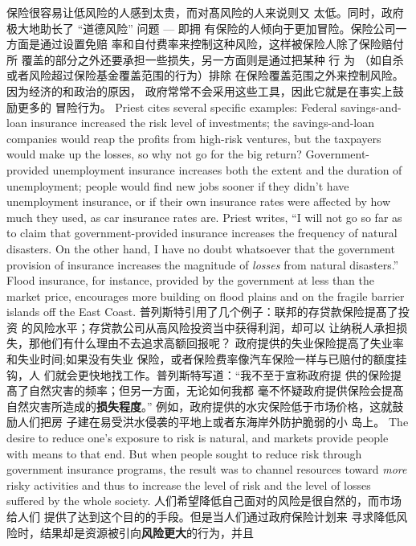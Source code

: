 \begin{paracol}{2}
保险很容易让低风险的人感到太贵，而对髙风险的人来说则又
太低。同时，政府极大地助长了 “道德风险” 问题 --- 即拥
有保险的人倾向于更加冒险。保险公司一方面是通过设置免赔
率和自付费率来控制这种风险，这样被保险人除了保险赔付所
覆盖的部分之外还要承担一些损失，另一方面则是通过把某种
行 为 （如自杀或者风险超过保险基金覆盖范围的行为）排除
在保险覆盖范围之外来控制风险。因为经济的和政治的原因，
政府常常不会采用这些工具，因此它就是在事实上鼓励更多的
冒险行为。
\switchcolumn*
Priest cites several specific examples: Federal savings-and-loan insurance increased the risk level of investments; the savings-and-loan companies would reap the profits from high-risk
ventures, but the taxpayers would make up the losses, so why
not go for the big return? Government-provided unemployment insurance increases both the extent and the duration of
unemployment; people would find new jobs sooner if they
didn't have unemployment insurance, or if their own insurance
rates were affected by how much they used, as car insurance
rates are. Priest writes, ``I will not go so far as to claim that government-provided insurance increases the frequency of natural
disasters. On the other hand, I have no doubt whatsoever that
the government provision of insurance increases the magnitude of \textit{losses} from natural disasters.'' Flood insurance, for instance,
provided by the government at less than the market price, encourages more building on flood plains and on the fragile barrier islands off the East Coast.
\switchcolumn
普列斯特引用了几个例子：联邦的存贷款保险提髙了投资
的风险水平；存贷款公司从高风险投资当中获得利润，却可以
让纳税人承担损失，那他们有什么理由不去追求高额回报呢？
政府提供的失业保险提高了失业率和失业时间;如果没有失业
保险，或者保险费率像汽车保险一样与已赔付的额度挂钩，人
们就会更快地找工作。普列斯特写道：“我不至于宣称政府提
供的保险提髙了自然灾害的频率；但另一方面，无论如何我都
毫不怀疑政府提供保险会提髙自然灾害所造成的\textbf{损失程度}。”
例如，政府提供的水灾保险低于市场价格，这就鼓励人们把房
子建在易受洪水侵袭的平地上或者东海岸外防护脆弱的小
岛上。
\switchcolumn*
The desire to reduce one's exposure to risk is natural, and
markets provide people with means to that end. But when people sought to reduce risk through government insurance programs, the result was to channel resources toward \textit{more} risky
activities and thus to increase the level of risk and the level of
losses suffered by the whole society.
\switchcolumn
人们希望降低自己面对的风险是很自然的，而市场给人们
提供了达到这个目的的手段。但是当人们通过政府保险计划来
寻求降低风险时，结果却是资源被引向\textbf{风险更大}的行为，并且

\end{paracol}
